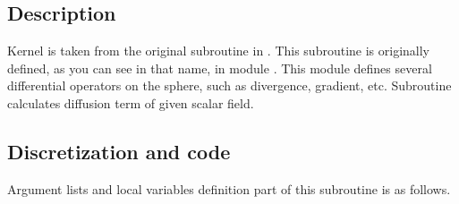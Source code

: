 \section{}\label{s:dyn_diffusion}

\subsection{Description}

Kernel  is taken from the original subroutine
 in \NICAM.
%
This subroutine is originally defined, as you can see in that name, in module
.
%
This module defines several differential operators on the sphere, such
as divergence, gradient, etc.
%
Subroutine  calculates diffusion term
 of given scalar field.

\subsection{Discretization and code}


Argument lists and local variables definition part of this subroutine is
as follows.

